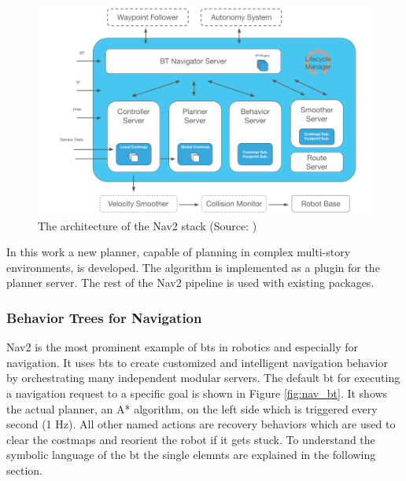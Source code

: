 \begin{figure}[h]
    \centering
    \includegraphics[width=\textwidth]{figures/02_state_of_the_art/nav2_architecture.png}
    \caption[The architecture of the Nav2 stack]{The architecture of the Nav2 stack (Source: \cite{https://navigation.ros.org/})}
    \label{fig:nav2_architecture}
\end{figure}

In this work a new planner, capable of planning in complex multi-story environments, is developed. The algorithm is implemented as a plugin for the planner server. The rest of the Nav2 pipeline is used with existing packages.

\subsubsection{Behavior Trees for Navigation}

Nav2 is the most prominent example of \glspl{bt} in robotics and especially for navigation. It uses \glspl{bt} to create customized and intelligent navigation behavior by orchestrating many independent modular servers. The default \gls{bt} for executing a navigation request to a specific goal is shown in Figure \ref{fig:nav_bt}. It shows the actual planner, an A* algorithm, on the left side which is triggered every second (1 Hz). All other named actions are recovery behaviors which are used to clear the costmaps and reorient the robot if it gets stuck. To understand the symbolic language of the \gls{bt} the single elemnts are explained in the following section.

